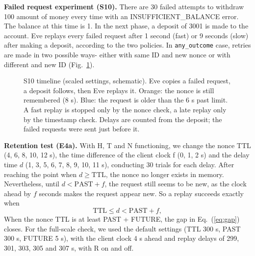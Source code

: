 \documentclass[conference]{IEEEtran}
\newcommand{\ao}{\texttt{any\_outcome}}
\begin{document}
\textbf{Failed request experiment (S10).} There are 30 failed attempts to withdraw 100 amount of money every time with an INSUFFICIENT\_BALANCE error. The balance at this time is 1. In the next phase, a deposit of 3001 is made to the account. Eve replays every failed request after 1 second (fast) or 9 seconds (slow) after making a deposit, according to the two policies. In \ao{} case, retries are made in two possible ways- either with same ID and new nonce or with different and new ID (Fig.~\ref{fig:s10}).

\begin{figure}[!t]
\centering
{}
\caption{S10 timeline (scaled settings, schematic). Eve copies a failed request, a deposit follows, then Eve replays it. Orange: the nonce is still remembered (8 s). Blue: the request is older than the 6 s past limit. A fast replay is stopped only by the nonce check, a late replay only by the timestamp check. Delays are counted from the deposit; the failed requests were sent just before it.}
\label{fig:s10}
\end{figure}

\textbf{Retention test (E4a).} With H, T and N functioning, we change the nonce TTL (4, 6, 8, 10, 12 s), the time difference of the client clock f (0, 1, 2 s) and the delay time $d$ (1, 3, 5, 6, 7, 8, 9, 10, 11 s), conducting 30 trials for each delay. After reaching the point when $d \ge \mathrm{TTL}$, the nonce no longer exists in memory. Nevertheless, until $d < \mathrm{PAST}+f$, the request still seems to be new, as the clock ahead by $f$ seconds makes the request appear new. So a replay succeeds exactly when
\begin{equation}
\mathrm{TTL} \le d < \mathrm{PAST} + f,
\label{eq:gap}
\end{equation}
When the nonce TTL is at least PAST + FUTURE, the gap in Eq.~(\ref{eq:gap}) closes. For the full-scale check, we used the default settings (TTL 300 s, PAST 300 s, FUTURE 5 s), with the client clock 4 s ahead and replay delays of 299, 301, 303, 305 and 307 s, with R on and off.
\end{document}
